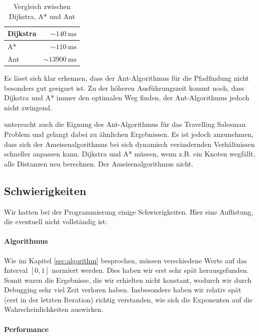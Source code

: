 \begin{table}[h]
\begin{tabular}{ | l | r | }
\hline
Dijkstra & $\sim\SI{140}{\milli\s}$ \\
\hline
A* & $\sim\SI{110}{\milli\s}$ \\
\hline
Ant & $\sim\SI{13900}{\milli\s}$  \\
\hline
\end{tabular}
\caption{Vergleich zwischen Dijkstra, A* und Ant}
\end{table}

\noindent
Es lässt sich klar erkennen, dass der Ant-Algorithmus für die Pfadfindung nicht besonders gut geeignet ist. Zu der höheren Ausführungszeit kommt noch, dass Dijkstra und A* immer den optimalen Weg finden, der Ant-Algorithmus jedoch nicht zwingend.

\citeauthor*{leo-perf} untersucht auch die Eignung des Ant-Algorithmus für das Travelling Salesman Problem und gelangt dabei zu ähnlichen Ergebnissen. Es ist jedoch anzunehmen, dass sich der Ameisenalgorithmus bei sich dynamisch verändernden Verhältnissen schneller anpassen kann. Dijkstra und A* müssen, wenn z.B. ein Knoten wegfällt, alle Distanzen neu berechnen. Der Ameisenalgorithmus nicht.

\subsection{Schwierigkeiten}

Wir hatten bei der Programmierung einige Schwierigkeiten. Hier eine Auflistung, die eventuell nicht vollständig ist:

\paragraph*{Algorithmus}

Wie im Kapitel \ref{sec:algorithm} besprochen, müssen verschiedene Werte auf das Interval $[0,1]$ normiert werden. Dies haben wir erst sehr spät herausgefunden. Somit waren die Ergebnisse, die wir erhielten nicht konstant, wodurch wir durch Debugging sehr viel Zeit verloren haben. Insbesondere haben wir relativ spät (erst in der letzten Iteration) richtig verstanden, wie sich die Exponenten auf die Wahrscheinlichkeiten auswirken.

\paragraph*{Performance}

